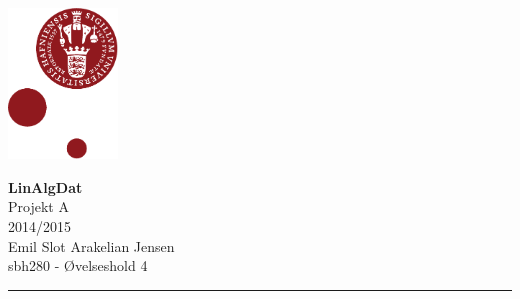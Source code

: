 \documentclass[12pt]{article}
\begin{document}
\begin{minipage}[b]{1.0\linewidth} 
\includegraphics[height=40mm]{KULogo}

\vspace*{-25ex}
\begin{center}
    {\Large \bf LinAlgDat} \vspace*{1ex} \\
    {\large Projekt A} \vspace*{1ex} \\
    {\large 2014/2015} \vspace*{1ex} \\
    {\large Emil Slot Arakelian Jensen} \vspace*{1ex}\\
    {\large sbh280 - Øvelseshold 4} 
\end{center}

\vspace*{-3pt}
{\color{KU-red}\hrule}
\end{minipage}

\newpage
\tableofcontents

\newpage
\end{document}
